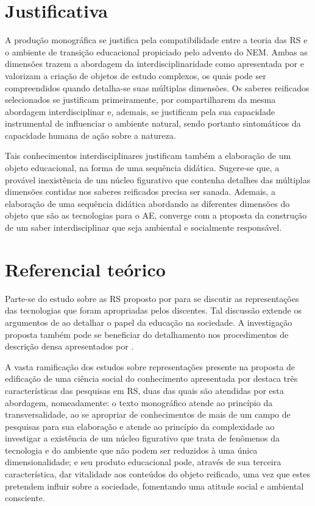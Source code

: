 \documentclass[
  12pt,       %
  openright,      %
  twoside,      %
  a4paper,      %
  english,      %
  french,       %
  spanish,      %
  brazil        %
  ]{abntex2}
\begin{document}
\chapter{Justificativa}

A produção monográfica se justifica pela compatibilidade entre a teoria das RS e o ambiente de transição educacional propiciado pelo advento do NEM. Ambas as dimensões trazem a abordagem da interdisciplinaridade como apresentada por  e valorizam a criação de objetos de estudo complexos, os quais pode ser compreendidos quando detalha-se suas múltiplas dimensões. Os saberes reificados selecionados se justificam primeiramente, por compartilharem da mesma abordagem interdisciplinar e, ademais, se justificam pela sua capacidade instrumental de influenciar o ambiente natural, sendo portanto sintomáticos da capacidade humana de ação sobre a natureza.

Tais conhecimentos interdisciplinares justificam também a elaboração de um objeto educacional, na forma de uma sequência didática. Sugere-se que, a provável inexistência de um núcleo figurativo que contenha detalhes das múltiplas dimensões contidas nos saberes reificados precisa ser sanada. Ademais, a elaboração de uma sequência didática abordando as diferentes dimensões do objeto que são as tecnologias para o AE, converge com a proposta da construção de um saber interdisciplinar que seja ambiental e socialmente responsável. 





\chapter{Referencial teórico}

Parte-se do estudo sobre as RS proposto por  para se discutir as representações das tecnologias que foram apropriadas pelos discentes. Tal discussão extende os argumentos de  ao detalhar o papel da educação na sociedade. A investigação proposta também pode se beneficiar do detalhamento nos procedimentos de descrição densa apresentados por .

A vasta ramificação dos estudos sobre representações presente na proposta de edificação de uma ciência social do conhecimento apresentada por  destaca três características das pesquisas em RS, duas das quais são atendidas por esta abordagem, nomeadamente: o texto monográfico atende ao princípio da transversalidade, ao se apropriar de conhecimentos de mais de um campo de pesquisas para sua elaboração e atende ao princípio da complexidade ao investigar a existência de um núcleo figurativo que trata de fenômenos da tecnologia e do ambiente que não podem ser reduzidos à uma única dimensionalidade; e seu produto educacional pode, através de sua terceira característica, dar vitalidade aos conteúdos do objeto reificado, uma vez que estes pretendem influir sobre a sociedade, fomentando uma atitude social e ambiental consciente.
\end{document}
